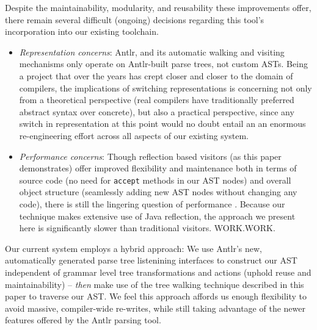 \documentclass[times]{speauth}
\begin{document}
Despite the maintainability, modularity, and reusability these improvements offer, there remain several difficult (ongoing) decisions regarding this tool's incorporation into our existing toolchain.

\begin{itemize}
\item \textit{Representation concerns}: Antlr, and its automatic walking and visiting mechanisms only operate on Antlr-built parse trees, not custom ASTs. Being a project that over the years has crept closer and closer to the domain of compilers, the implications of switching representations is concerning not only from a theoretical perspective (real compilers have traditionally preferred abstract syntax over concrete), but also a practical perspective, since any switch in representation at this point would no doubt entail an an enormous re-engineering effort across all aspects of our existing system.

\item \textit{Performance concerns}: Though reflection based visitors (as this paper demonstrates) offer improved flexibility and maintenance both in terms of source code (no need for \texttt{accept} methods in our AST nodes) and overall object structure (seamlessly adding new AST nodes without changing any code), there is still the lingering question of performance \cite{tanumoy:2012}.  Because our technique makes extensive use of Java reflection, the approach we present here is significantly slower than traditional visitors. WORK.WORK.
\end{itemize}

Our current system employs a hybrid approach: We use Antlr's new, automatically generated parse tree listenining interfaces to construct our AST independent of grammar level tree transformations and actions (uphold reuse and maintainability) -- \textit{then} make use of the tree walking technique described in this paper to traverse our AST. We feel this approach affords us enough flexibility to avoid massive, compiler-wide re-writes, while still taking advantage of the newer features offered by the Antlr parsing tool.

\end{document}
